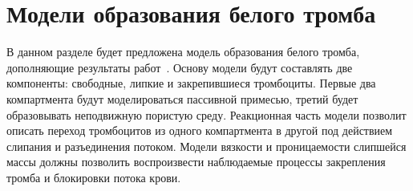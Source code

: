 % 
% 
% 
% 
% 


\section{Модели образования белого тромба}
\label{section:blood:white_clot_model}

В данном разделе будет предложена модель образования белого тромба,
дополняющие результаты работ~\cite{bouchnita2020mathematical, vassilevski2020parallel}.
Основу модели будут составлять две компоненты: свободные, липкие и закрепившиеся тромбоциты.
Первые два компартмента будут моделироваться пассивной примесью,
третий будет образовывать неподвижную пористую среду.
Реакционная часть модели позволит описать переход тромбоцитов из одного компартмента в другой
под действием слипания и разъединения потоком.
Модели вязкости и проницаемости слипшейся массы должны позволить воспроизвести наблюдаемые процессы закрепления тромба
и блокировки потока крови.


